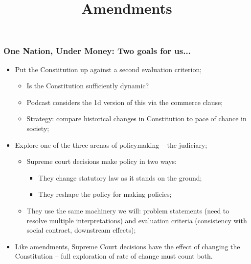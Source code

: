 \documentclass[aspectratio=169]{beamer}
\title{Amendments}
\date{}
\theoremstyle{principle}
\begin{document}
\begin{frame}
\frametitle{One Nation, Under Money: Two goals for us...}

\begin{itemize}

\item Put the Constitution up against a second evaluation criterion;
\begin{itemize}
\item Is the Constitution sufficiently dynamic?
\item Podcast considers the 1d version of this via the commerce clause;
\item Strategy: compare historical changes in Constitution to pace of chance in society;
\end{itemize}
\bigskip
\bigskip
\item Explore one of the three arenas of policymaking -- the judiciary;
\begin{itemize}
\item Supreme court decisions make policy in two ways:
\begin{itemize}
\item They change statutory law as it stands on the ground;
\item They reshape the policy for making policies;
\end{itemize}
\item They use the same machinery we will: problem statements (need to resolve multiple interpretations) and evaluation criteria (consistency with social contract, downstream effects);
\end{itemize}
\bigskip
\bigskip

\item Like amendments, Supreme Court decisions have the effect of changing the Constitution -- full exploration of rate of change must count both.

\end{itemize}

\end{frame}
\end{document}
